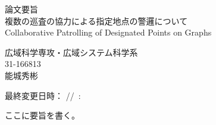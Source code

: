 \documentclass[a4paper,12pt]{jsarticle}
\begin{document}
\begin{center}
  {\LARGE 論文要旨}\\
  \vfill
  {\LARGE 複数の巡査の協力による指定地点の警邏について}\\
  {\normalsize Collaborative Patrolling of Designated Points on Graphs}
\end{center}

\begin{flushright}
広域科学専攻・広域システム科学系 \\
31-166813 \\
能城秀彬
\end{flushright} 
\vspace{30pt}

最終変更日時：
{\the\year/\the\month/\the\day\ \the\hour:\the\minute}

ここに要旨を書く。




\thispagestyle{empty}  %
\end{document}
